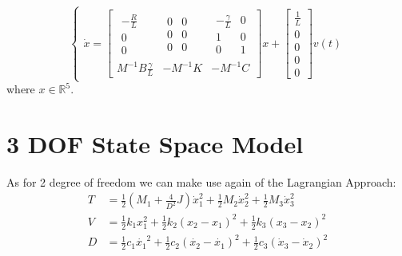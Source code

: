 \begin{equation}
\begin{cases}
\dot{x}=
\left[ \begin{array} { c|c|c  } 
                \begin{array}{c} 
               -\frac{R}{L} \\ 
                0 \\
                0 
                \end{array} &
                \begin{array}{cc} 
               0 & 0 \\ 
                0 & 0 \\
                0  & 0 
                \end{array}&
                \begin{array}{cc} 
               -\frac{\gamma}{L} & 0 \\ 
                1 & 0 \\
                0  & 1 
                \end{array} \\
                \hline 
                M^{-1}B\frac{\gamma} {L}& -M^{-1}K & -M^{-1}C
\end{array} \right] 
x+\begin{bmatrix}\frac{1}{L} \\ 0 \\ 0 \\ 0 \\ 0\end{bmatrix}v(t)
\end{cases}
\end{equation}
where $x \in \mathbb{R}^5$.

\section{3 DOF State Space Model}
As for 2 degree of freedom we can make use again of the Lagrangian Approach:
\begin{align*}
T &= \frac{1}{2} (M_1 + \frac{4}{D^2}J)\dot{x}_1^2+\frac{1}{2}M_2\dot{x}_2^2 + \frac{1}{2}M_3 \dot{x}_3^2 \\
V &= \frac{1}{2}k_1x_1^2 + \frac{1}{2}k_2(x_2-x_1)^2 +\frac{1}{2}k_3 (x_3-x_2)^2\\
D &= \frac{1}{2}c_1\dot{x_1}^2 + \frac{1}{2}c_2(\dot{x_2}-\dot{x_1})^2 +\frac{1}{2}c_3(\dot{x}_3-\dot{x}_2)^2
\end{align*}

